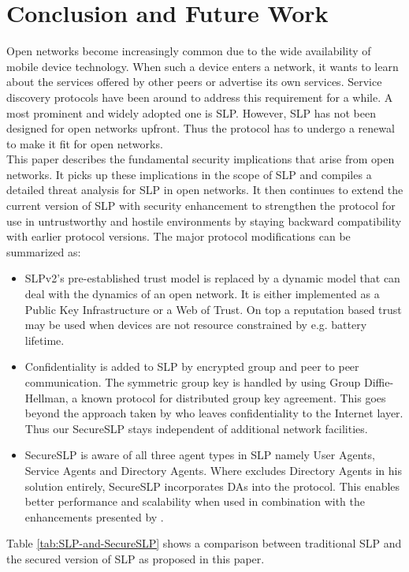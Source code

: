 \section{Conclusion and Future Work}
Open networks become increasingly common due to the wide availability of mobile device technology. When such a device enters a network, it wants to learn about the services offered by other peers or advertise its own services. Service discovery protocols have been around to address this requirement for a while. A most prominent and widely adopted one is SLP. However, SLP has not been designed for open networks upfront. Thus the protocol has to undergo a renewal to make it fit for open networks.\\
This paper describes the fundamental security implications that arise from open networks. It picks up these implications in the scope of SLP and compiles a detailed threat analysis for SLP in open networks. It then continues to extend the current version of SLP with security enhancement to strengthen the protocol for use in untrustworthy and hostile environments by staying backward compatibility with earlier protocol versions. The major protocol modifications can be summarized as:
\begin{itemize}
\item SLPv2's pre-established trust model is replaced by a dynamic model that can deal with the dynamics of an open network. It is either implemented as a Public Key Infrastructure or a Web of Trust. On top a reputation based trust may be used when devices are not resource constrained by e.g. battery lifetime.
\item Confidentiality is added to SLP by encrypted group and peer to peer communication. The symmetric group key is handled by using Group Diffie-Hellman, a known protocol for distributed group key agreement. This goes beyond the approach taken by \citet{Hollick2001} who leaves confidentiality to the Internet layer. Thus our SecureSLP stays independent of additional network facilities.
\item SecureSLP is aware of all three agent types in SLP namely User Agents, Service Agents and Directory Agents. Where \citet{Hollick2001} excludes Directory Agents in his solution entirely, SecureSLP incorporates DAs into the protocol. This enables better performance and scalability when used in combination with the enhancements presented by \citet{Zhao2003}.
\end{itemize}
Table \ref{tab:SLP-and-SecureSLP} shows a comparison between traditional SLP and the secured version of SLP as proposed in this paper.
